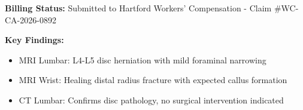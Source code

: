 \documentclass[11pt]{article}
\begin{document}
\vspace{1.5em}

\textbf{Billing Status:} Submitted to Hartford Workers' Compensation - Claim \#WC-CA-2026-0892

\vspace{0.5em}
\textbf{Key Findings:}
\begin{itemize}
\item MRI Lumbar: L4-L5 disc herniation with mild foraminal narrowing
\item MRI Wrist: Healing distal radius fracture with expected callus formation
\item CT Lumbar: Confirms disc pathology, no surgical intervention indicated
\end{itemize}
\end{document}
